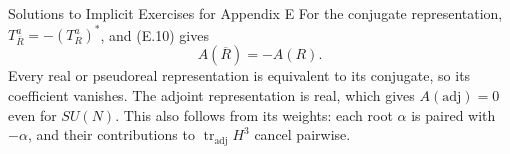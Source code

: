 \begin{bankssolutions}{Solutions to Implicit Exercises for Appendix E}
For the conjugate representation,
$T_{\overline R}^a=-(T_R^a)^*$, and (E.10) gives
\[
  A(\overline R)=-A(R).
  \tag{E.15}
\]
Every real or pseudoreal representation is equivalent to its conjugate, so
its coefficient vanishes.  The adjoint representation is real, which gives
$A(\mathrm{adj})=0$ even for $SU(N)$.  This also follows from its weights:
each root $\alpha$ is paired with $-\alpha$, and their contributions to
$\operatorname{tr}_{\mathrm{adj}}H^3$ cancel pairwise.

\end{bankssolutions}
